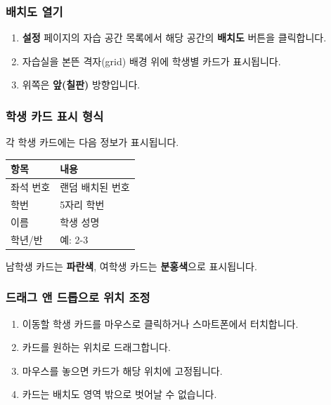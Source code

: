 \documentclass[a4paper,12pt]{article}
\newcommand{\menu}[1]{\textcolor{primary}{\textbf{#1}}}
\begin{document}
\subsubsection{배치도 열기}

\begin{enumerate}[leftmargin=1.5em]
    \item \menu{설정} 페이지의 자습 공간 목록에서 해당 공간의 \menu{배치도} 버튼을 클릭합니다.
    \item 자습실을 본뜬 격자(grid) 배경 위에 학생별 카드가 표시됩니다.
    \item 위쪽은 \textbf{앞(칠판)} 방향입니다.
\end{enumerate}

\subsubsection{학생 카드 표시 형식}

각 학생 카드에는 다음 정보가 표시됩니다.

\begin{center}
\begin{tabular}{ll}
\toprule
\textbf{항목} & \textbf{내용} \\
\midrule
좌석 번호 & 랜덤 배치된 번호 \\
학번 & 5자리 학번 \\
이름 & 학생 성명 \\
학년/반 & 예: 2-3 \\
\bottomrule
\end{tabular}
\end{center}

남학생 카드는 \textbf{파란색}, 여학생 카드는 \textbf{분홍색}으로 표시됩니다.

\subsubsection{드래그 앤 드롭으로 위치 조정}

\begin{enumerate}[leftmargin=1.5em]
    \item 이동할 학생 카드를 마우스로 클릭하거나 스마트폰에서 터치합니다.
    \item 카드를 원하는 위치로 드래그합니다.
    \item 마우스를 놓으면 카드가 해당 위치에 고정됩니다.
    \item 카드는 배치도 영역 밖으로 벗어날 수 없습니다.
\end{enumerate}
\end{document}
